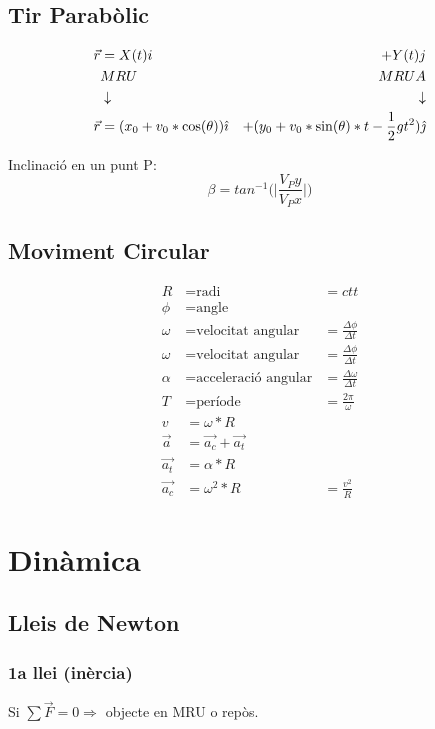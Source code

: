 \subsection{Tir Parabòlic}
\begin{align}\label{Tir Parabolic}
    \vec{r} &= X(t)i & + Y(t)j \notag \\
    & MRU &  MRUA \notag \\
    & \downarrow  & \downarrow \notag \\
    \vec{r} &= (x_0+v_0*\cos(\theta)) \hat{\imath} & + (y_0 + v_0*\sin(\theta)*t - \frac{1}{2}gt^2) \hat{\jmath}
\end{align}

Inclinació en un punt P:
\begin{equation}\label{eqi:Inclinacio tir parabolic}
    \beta = tan^{-1}\bigg(\bigg|\frac{V_Py}{V_Px}\bigg|\bigg)
\end{equation}

\subsection{Moviment Circular}
\begin{align*}
    R &= \text{radi} &= ctt \\
    \phi &= \text{angle} \\
    \omega &= \text{velocitat angular} &= \frac{\Delta \phi}{\Delta t} \\
    \omega &= \text{velocitat angular} &= \frac{\Delta \phi}{\Delta t} \\
    \alpha &= \text{acceleració angular} &= \frac{\Delta \omega}{\Delta t} \\
    T &= \text{període} &= \frac{2\pi}{\omega} \\
    v &= \omega * R \\
    \vec{a} &= \vec{a_c} + \vec{a_t} \\
    \vec{a_t} &= \alpha * R \\
    \vec{a_c} &= \omega^2*R &= \frac{v^2}{R}
\end{align*}

\section{Dinàmica}
\label{sec:dinamica}

\subsection{Lleis de Newton}
\subsubsection{1a llei (inèrcia)}
\begin{center}
    Si $\sum \vec{F} = 0 \Rightarrow$ objecte en MRU o repòs.
\end{center}

